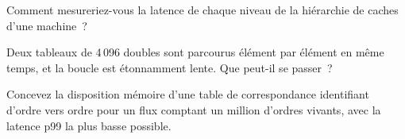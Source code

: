 \begin{interviewq}\label{iq:ll:memory-hierarchy-and-caches:4}
Comment mesureriez-vous la latence de chaque niveau de la hiérarchie de caches d'une machine~?
\end{interviewq}

\begin{interviewq}\label{iq:ll:memory-hierarchy-and-caches:5}
Deux tableaux de 4\,096 doubles sont parcourus élément par élément en même temps, et la boucle est étonnamment lente. Que peut-il
se passer~?
\end{interviewq}

\begin{interviewq}\label{iq:ll:memory-hierarchy-and-caches:6}
Concevez la disposition mémoire d'une table de correspondance identifiant d'ordre vers ordre pour un flux comptant un million d'ordres vivants, avec la latence p99 la plus basse possible.
\end{interviewq}
